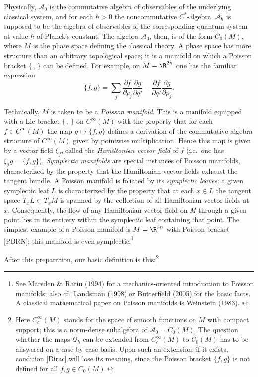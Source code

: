 \documentclass[12pt,titlepage]{article}
\newcommand{\beq}{\begin{equation}}
\newcommand{\eeq}{\end{equation}}
\newcommand{\ca}{$C^*$-algebra} \newcommand{\jba}{JB-algebra}
\newcommand{\cin}{C^{\infty}} \newcommand{\cci}{C^{\infty}_c}
\newcommand{\qh}{q_{\hbar}} \newcommand{\sgh}{\sigma_{\hbar}}
\newcommand{\er}{\eqref}
\newcommand{\CA}{{\mathcal A}} \newcommand{\CB}{{\mathcal B}}
\newcommand{\CQ}{{\mathcal Q}} \newcommand{\CR}{{\mathcal R}}
\renewcommand{\qh}{\CQ_{\hbar}}
\begin{document}
Physically, $\CA_0$ is the commutative algebra of observables of the underlying classical system, and for each $\hbar>0$ the noncommutative \ca\ $\CA_{\hbar}$ is supposed to be the algebra of observables of the corresponding quantum system at value $\hbar$ of Planck's constant. The algebra $\CA_0$, then, is of the form $C_0(M)$, where $M$ is the phase space defining the classical theory.  A phase space has more structure than an arbitrary topological space; it is a manifold on which a Poisson bracket $\{\, ,\,\}$ can be defined. 
For example, on $M=\R^{2n}$ one has the familiar expression
\beq \{f,g\}=\sum_j\frac{\partial f}{\partial p_j}\frac{\partial g}{\partial
q^j}-\frac{\partial f}{\partial q^j}\frac{\partial g}{\partial
p_j}. \label{PBRN}\eeq 

Technically, $M$ is taken to be a {\it Poisson manifold}. This  is a manifold equipped with a Lie bracket $\{\, ,\,\}$ on $\cin(M)$ with the property that for each $f\in\cin(M)$ the map $g\mapsto \{f,g\}$ defines  a derivation of  the commutative algebra structure of $\cin(M)$ given by pointwise multiplication.  Hence this map is given by a vector field $\xi_f$, called
the {\it Hamiltonian vector field} of $f$ (i.e.\ one has $\xi_fg=\{f,g\}$).
 {\it Symplectic manifolds} are special instances of Poisson manifolds, characterized by the property that the  Hamiltonian vector fields exhaust the tangent bundle. A Poisson manifold
is foliated by its {\it symplectic leaves}: a given symplectic leaf $L$ is characterized by the property that at each $x\in L$ the tangent space $T_xL\subset T_xM$ is spanned by the collection of all Hamiltonian vector fields at $x$. Consequently, the flow of any Hamiltonian
vector field on $M$ through a given point lies in its entirety within the symplectic leaf containing that point.  The simplest example of a Poisson manifold is $M=\R^{2n}$ with Poisson bracket \er{PBRN}; this manifold is even symplectic.\footnote{See Marsden \&\ Ratiu (1994) for a mechanics-oriented introduction to Poisson manifolds; also cf.\ Landsman (1998)
or Butterfield (2005) for the basic facts. A classical mathematical paper on Poisson manifolds is Weinstein (1983). \label{PMFN}}

After this preparation, our basic definition is this:\footnote{Here 
$\cci(M)$ stands for the space of smooth functions on $M$ with compact support; this is a norm-dense subalgebra of $\CA_0=C_0(M)$. The question whether the maps $\qh$ can be extended from $\cci(M)$ to $C_0(M)$ has to be answered on a case by case basis. Upon such an extension, if it exists, condition \er{Dirac} will lose its meaning, since the Poisson bracket $\{f,g\}$ is not defined for all $f,g\in C_0(M)$.}
\end{document}
